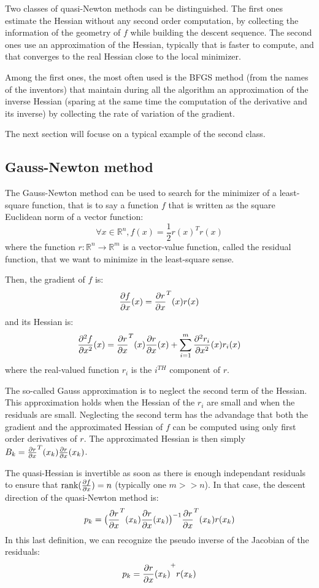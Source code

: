 \documentclass{book}
\begin{document}
Two classes of quasi-Newton methods can be distinguished. The first ones estimate the Hessian without any second order computation, by collecting the information of the geometry of $f$ while building the descent sequence. The second ones use an approximation of the Hessian, typically that is faster to compute, and that converges to the real Hessian close to the local minimizer.

Among the first ones, the most often used is the BFGS method (from the names of the inventors) that maintain during all the algorithm an approximation of the inverse Hessian (sparing at the same time the computation of the derivative and its inverse) by collecting the rate of variation of the gradient.

The next section will focuse on a typical example of the second class.

\subsection{Gauss-Newton method}

The Gauss-Newton method can be used to search for the minimizer of a least-square function, that is to say a function $f$ that is written as the square Euclidean norm of a vector function:
\[ \forall x \in \mathbb{R}^n, f(x) = \frac{1}{2} r(x)^T r(x) \]
where the function $r : \mathbb{R}^n \rightarrow \mathbb{R}^m$ is a vector-value function, called the residual function, that we want to minimize in the least-square sense.

Then, the gradient of $f$ is:
\[ \frac{\partial{f}}{\partial{x}}(x) = \frac{\partial{r}}{\partial{x}}^T(x) r(x) \]
and its Hessian is:
\[ \frac{\partial^2{f}}{\partial{x}^2}(x) = \frac{\partial{r}}{\partial{x}}^T(x) \frac{\partial{r}}{\partial{x}}(x) + \sum_{i=1}^m \frac{\partial^2{r_i}}{\partial{x}^2}(x) r_i(x) \]
where the real-valued function $r_i$ is the $i^{TH}$ component of $r$.

The so-called Gauss approximation is to neglect the second term of the Hessian. This approximation holds when the Hessian of the $r_i$ are small and when the residuals are small. 
Neglecting the second term has the advandage that both the gradient and the approximated Hessian of $f$ can be computed using only first order derivatives of $r$. The approximated Hessian is then simply $B_k =  \frac{\partial{r}}{\partial{x}}^T(x_k) \frac{\partial{r}}{\partial{x}}(x_k)$.

The quasi-Hessian is invertible as soon as there is enough independant residuals to ensure that $\textrm{rank} (\frac{\partial{f}}{\partial{x}}) = n$ (typically one $m>>n$).
In that case, the descent direction of the quasi-Newton method is:
\[ p_k = \big( \frac{\partial{r}}{\partial{x}}^T(x_k) \frac{\partial{r}}{\partial{x}}(x_k) \big)^{-1} \frac{\partial{r}}{\partial{x}}^T(x_k) r(x_k) \]
In this last definition, we can recognize the pseudo inverse of the Jacobian of the residuals:
\[ p_k = {\frac{\partial{r}}{\partial{x}}(x_k)}^{+} r(x_k) \]
\end{document}
